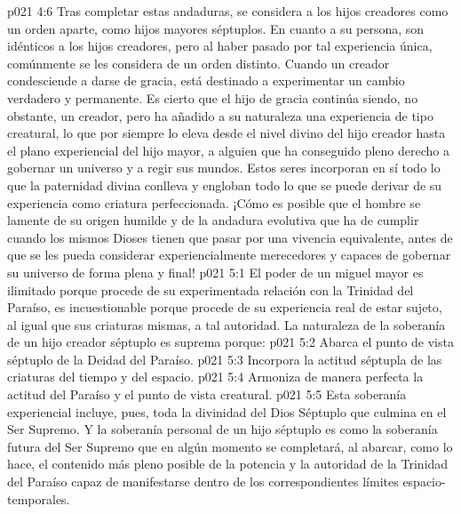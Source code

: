 \vs p021 4:6 \pc Tras completar estas andaduras, se considera a los hijos creadores como un orden aparte, como hijos mayores séptuplos. En cuanto a su persona, son idénticos a los hijos creadores, pero al haber pasado por tal experiencia única, comúnmente se les considera de un orden distinto. Cuando un creador condesciende a darse de gracia, está destinado a experimentar un cambio verdadero y permanente. Es cierto que el hijo de gracia continúa siendo, no obstante, un creador, pero ha añadido a su naturaleza una experiencia de tipo creatural, lo que por siempre lo eleva desde el nivel divino del hijo creador hasta el plano experiencial del hijo mayor, a alguien que ha conseguido pleno derecho a gobernar un universo y a regir sus mundos. Estos seres incorporan en sí todo lo que la paternidad divina conlleva y engloban todo lo que se puede derivar de su experiencia como criatura perfeccionada. ¡Cómo es posible que el hombre se lamente de su origen humilde y de la andadura evolutiva que ha de cumplir cuando los mismos Dioses tienen que pasar por una vivencia equivalente, antes de que se les pueda considerar experiencialmente merecedores y capaces de gobernar su universo de forma plena y final!
\vs p021 5:1 El poder de un miguel mayor es ilimitado porque procede de su experimentada relación con la Trinidad del Paraíso, es incuestionable porque procede de su experiencia real de estar sujeto, al igual que sus criaturas mismas, a tal autoridad. La naturaleza de la soberanía de un hijo creador séptuplo es suprema porque:
\vs p021 5:2 Abarca el punto de vista séptuplo de la Deidad del Paraíso.
\vs p021 5:3 Incorpora la actitud séptupla de las criaturas del tiempo y del espacio.
\vs p021 5:4 Armoniza de manera perfecta la actitud del Paraíso y el punto de vista creatural.
\vs p021 5:5 \pc Esta soberanía experiencial incluye, pues, toda la divinidad del Dios Séptuplo que culmina en el Ser Supremo. Y la soberanía personal de un hijo séptuplo es como la soberanía futura del Ser Supremo que en algún momento se completará, al abarcar, como lo hace, el contenido más pleno posible de la potencia y la autoridad de la Trinidad del Paraíso capaz de manifestarse dentro de los correspondientes límites espacio\hyp{}temporales.
